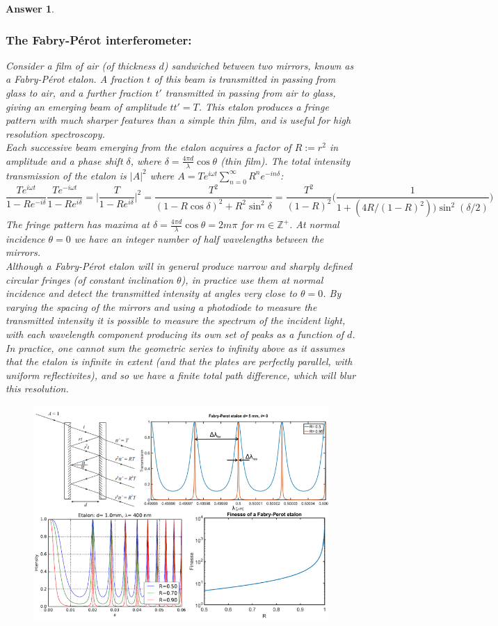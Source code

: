 \documentclass[a4paper]{article}
\newtheorem{ans}{Answer}[subsection]
\theoremstyle{new}
\begin{document}
\begin{ans}
\subsubsection*{The Fabry-Pérot interferometer:}
Consider a film of air (of thickness $d$) sandwiched between two mirrors, known as a Fabry-Pérot etalon. A fraction $t$ of this beam is transmitted in passing from glass to air, and a further fraction $t'$ transmitted in passing from air to glass, giving an emerging beam of amplitude $tt'=T$. This etalon produces a fringe pattern with much sharper features than a simple thin film, and is useful for high resolution spectroscopy. \\[5pt]
Each successive beam emerging from the etalon acquires a factor of $R:=r^2$ in amplitude and a phase shift $\delta$, where $\delta=\frac{4\pi d}{\lambda}\cos\theta$ (thin film). The total intensity transmission of the etalon is $|A|^2$ where $A=Te^{i\omega t}\sum_{n=0}^\infty R^ne^{-in\delta}$:
$$\frac{Te^{i\omega t}}{1-Re^{-i\delta}}\frac{Te^{-i\omega t}}{1-Re^{i\delta}}=\bigg|\frac{T}{1-Re^{i\delta}}\bigg|^2=\frac{T^2}{(1-R\cos\delta)^2+R^2\sin^2\delta}=\frac{T^2}{(1-R)^2}\bigg(\frac{1}{1+(4R/(1-R)^2))\sin^2(\delta/2)}\bigg)$$
The fringe pattern has maxima at $\delta=\frac{4\pi d}{\lambda}\cos\theta=2m\pi$ for $m\in\mathbb{Z}^+$. At normal incidence $\theta=0$ we have an integer number of half wavelengths between the mirrors.\\[5pt]
Although a Fabry-Pérot etalon will in general produce narrow and sharply defined circular fringes (of constant inclination $\theta$), in practice use them at normal incidence and detect the transmitted intensity at angles very close to $\theta=0$. By varying the spacing of the mirrors and using a photodiode to measure the transmitted intensity it is possible to measure the spectrum of the incident light, with each wavelength component producing its own set of peaks as a function of $d$.\\[5pt]
In practice, one cannot sum the geometric series to infinity above as it assumes that the etalon is infinite in extent (and that the plates are perfectly parallel, with uniform reflectivites), and so we have a finite total path difference, which will blur this resolution.
\begin{figure}[H]
    \centering
    \includegraphics[width=\linewidth]{fabryperot.PNG}

\end{figure}
\end{ans}
\end{document}
